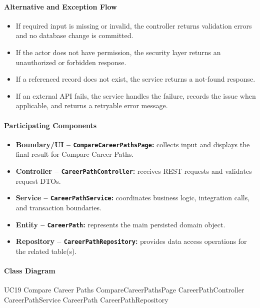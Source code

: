 \paragraph{Alternative and Exception Flow}

\begin{itemize}
    \item If required input is missing or invalid, the controller returns validation errors and no database change is committed.
    \item If the actor does not have permission, the security layer returns an unauthorized or forbidden response.
    \item If a referenced record does not exist, the service returns a not-found response.
    \item If an external API fails, the service handles the failure, records the issue when applicable, and returns a retryable error message.
\end{itemize}

\paragraph{Participating Components}

\begin{itemize}
    \item \textbf{Boundary/UI -- \texttt{CompareCareerPathsPage}:} collects input and displays the final result for Compare Career Paths.
    \item \textbf{Controller -- \texttt{CareerPathController}:} receives REST requests and validates request DTOs.
    \item \textbf{Service -- \texttt{CareerPathService}:} coordinates business logic, integration calls, and transaction boundaries.
    \item \textbf{Entity -- \texttt{CareerPath}:} represents the main persisted domain object.
    \item \textbf{Repository -- \texttt{CareerPathRepository}:} provides data access operations for the related table(s).
\end{itemize}

\paragraph{Class Diagram}

\ClassDiagram
{UC19 Compare Career Paths}
{CompareCareerPathsPage}
{CareerPathController}
{CareerPathService}
{CareerPath}
{CareerPathRepository}


